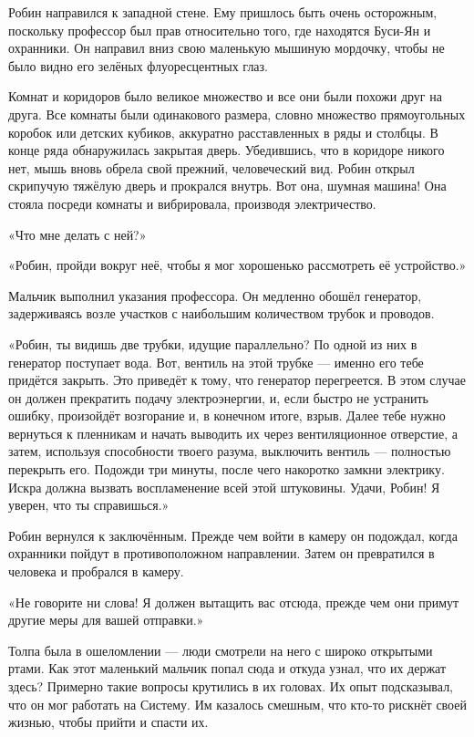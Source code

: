 \documentclass[a4paper,12pt]{book}
\begin{document}
\par
Робин направился к западной стене. Ему пришлось быть очень осторожным, поскольку профессор был прав относительно того, где находятся Буси-Ян и охранники. Он направил вниз свою маленькую мышиную мордочку, чтобы не было видно его зелёных флуоресцентных глаз.
\par
Комнат и коридоров было великое множество и все они были похожи друг на друга. Все комнаты были одинакового размера, словно множество прямоугольных коробок или детских кубиков, аккуратно расставленных в ряды и столбцы. В конце ряда обнаружилась закрытая дверь. Убедившись, что в коридоре никого нет, мышь вновь обрела свой прежний, человеческий вид. Робин открыл скрипучую тяжёлую дверь и прокрался внутрь. Вот она, шумная машина! Она стояла посреди комнаты и вибрировала, производя электричество.
\par
«Что мне делать с ней?»
\par
«Робин, пройди вокруг неё, чтобы я мог хорошенько рассмотреть её устройство.»
\par
Мальчик выполнил указания профессора. Он медленно обошёл генератор, задерживаясь возле участков с наибольшим количеством трубок и проводов.
\par
«Робин, ты видишь две трубки, идущие параллельно? По одной из них в генератор поступает вода. Вот, вентиль на этой трубке — именно его тебе придётся закрыть. Это приведёт к тому, что генератор перегреется. В этом случае он должен прекратить подачу электроэнергии, и, если быстро не устранить ошибку, произойдёт возгорание и, в конечном итоге, взрыв. Далее тебе нужно вернуться к пленникам и начать выводить их через вентиляционное отверстие, а затем, используя способности твоего разума, выключить вентиль — полностью перекрыть его. Подожди три минуты, после чего накоротко замкни электрику. Искра должна вызвать воспламенение всей этой штуковины. Удачи, Робин! Я уверен, что ты справишься.»\\
\par
Робин вернулся к заключённым. Прежде чем войти в камеру он подождал, когда охранники пойдут в противоположном направлении. Затем он превратился в человека и пробрался в камеру.
\par
«Не говорите ни слова! Я должен вытащить вас отсюда, прежде чем они примут другие меры для вашей отправки.»
\par
Толпа была в ошеломлении — люди смотрели на него с широко открытыми ртами. Как этот маленький мальчик попал сюда и откуда узнал, что их держат здесь? Примерно такие вопросы крутились в их головах. Их опыт подсказывал, что он мог работать на Систему. Им казалось смешным, что кто-то рискнёт своей жизнью, чтобы прийти и спасти их.
\end{document}
